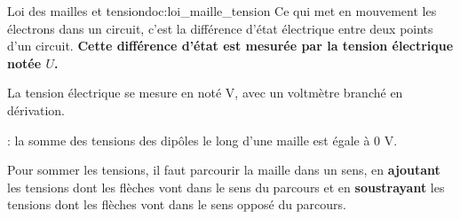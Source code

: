 \begin{doc}{Loi des mailles et tension}{doc:loi_maille_tension}
  Ce qui met en mouvement les électrons dans un circuit, c'est la différence d'état électrique entre deux points d'un circuit.
  \textbf{Cette différence d'état est mesurée par la tension électrique notée $U$.}
  \begin{encart}
    La tension électrique se mesure en  noté V, avec un voltmètre branché en dérivation.
  \end{encart}
  \begin{encart}
     : la somme des tensions des dipôles le long d'une maille est égale à 0 V.
  \end{encart}
  \chevron Pour sommer les tensions, il faut parcourir la maille dans un sens, en \textbf{ajoutant} les tensions dont les flèches vont dans le sens du parcours et en \textbf{soustrayant} les tensions dont les flèches vont dans le sens opposé du parcours.
\end{doc}

